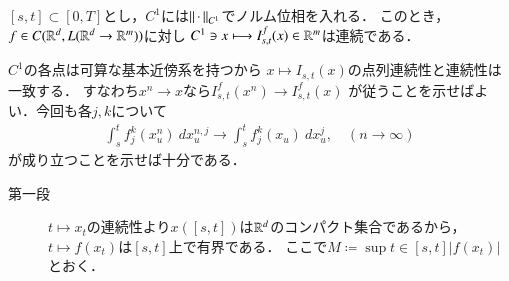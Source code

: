 \begin{screen}
	\begin{thm}\label{thm:T_s_t_continuous_w_r_t_C1_norm}
		$[s,t] \subset [0,T]$とし，$C^1$には$\left\|\, \cdot\, \right\|_{C^1}$でノルム位相を入れる．
		このとき，$f \in C(\mathbb{R}^d,L(\mathbb{R}^d \rightarrow \mathbb{R}^m))$に対し
		$C^1 \ni x \longmapsto I^f_{s,t}(x) \in \mathbb{R}^m$は連続である．
	\end{thm}
\end{screen}

\begin{prf}
	$C^1$の各点は可算な基本近傍系を持つから
	$x \longmapsto I_{s,t}(x)$の点列連続性と連続性は一致する．
	すなわち$x^n \longrightarrow x$なら$I^f_{s,t}(x^n) \longrightarrow I^f_{s,t}(x)$
	が従うことを示せばよい．今回も各$j,k$について
	\begin{align}
		\int_s^t f^k_j(x^n_u)\ dx^{n,j}_u
		\longrightarrow \int_s^t f^k_j(x_u)\ dx^j_u,
		\quad (n \longrightarrow \infty)
		\label{eq:thm_T_s_t_continuous_w_r_t_C1_norm}
	\end{align}
	が成り立つことを示せば十分である．
	\begin{description}
		\item[第一段] $t \longmapsto x_t$の連続性より$x([s,t])$は$\mathbb{R}^d$のコンパクト集合であるから，
			$t \longmapsto f(x_t)$は$[s,t]$上で有界である．
			ここで$M \coloneqq \sup{t \in [s,t]}{|f(x_t)|}$とおく．
			

\end{description}
\end{prf}
